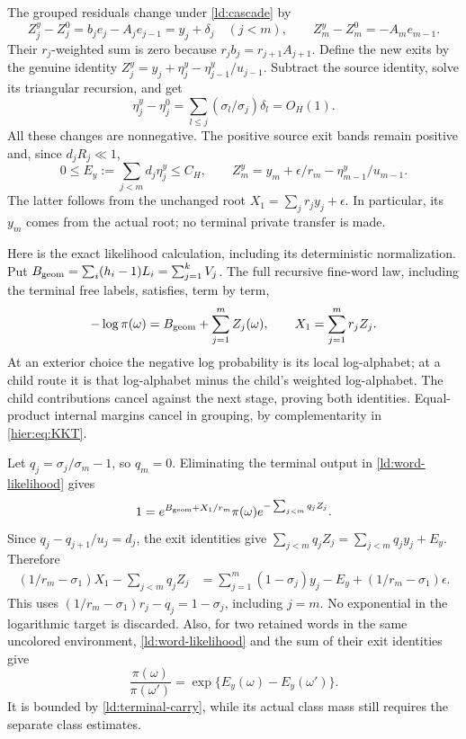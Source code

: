 The grouped residuals change under \eqref{ld:cascade} by
\begin{equation}
 Z_j^y-Z_j^0=b_je_j-A_je_{j-1}=y_j+\delta_j\quad(j<m),\qquad
 Z_m^y-Z_m^0=-A_me_{m-1}.
 \label{ld:output-changes}
\end{equation}
Their \(r_j\)-weighted sum is zero because
\(r_jb_j=r_{j+1}A_{j+1}\).  Define the new exits by the genuine
identity \(Z_j^y=y_j+\eta_j^y-\eta_{j-1}^y/u_{j-1}\).
Subtract the source identity, solve its triangular recursion, and get
\begin{equation}
 \eta_j^y-\eta_j^0=
       \sum_{l\le j}(\sigma_l/\sigma_j)\delta_l=O_H(1).
 \label{ld:exit-changes}
\end{equation}
All these changes are nonnegative.  The positive source exit bands
remain positive and, since \(d_jR_j\ll1\),
\begin{equation}
 0\le E_y:=\sum_{j<m}d_j\eta_j^y\le C_H,\qquad
 Z_m^y=y_m+\epsilon/r_m-\eta_{m-1}^y/u_{m-1}.
 \label{ld:terminal-carry}
\end{equation}
The latter follows from the unchanged root
\(X_1=\sum_jr_jy_j+\epsilon\).  In particular, its \(y_m\)
comes from the actual root; no terminal private transfer is made.

Here is the exact likelihood calculation, including its deterministic
normalization.  Put
\(B_{\rm geom}=\sum_i(h_i-1)L_i=\sum_{j=1}^kV_j\).
The full recursive fine-word law, including the terminal free labels,
satisfies, term by term,
\begin{equation}
 -\log\pi(\omega)=B_{\rm geom}+\sum_{j=1}^mZ_j(\omega),\qquad
 X_1=\sum_{j=1}^mr_jZ_j.
 \label{ld:word-likelihood}
\end{equation}
At an exterior choice the negative log probability is its local
log-alphabet; at a child route it is that log-alphabet minus the
child's weighted log-alphabet.  The child contributions cancel
against the next stage, proving both identities.  Equal-product
internal margins cancel in grouping, by complementarity in
\eqref{hier:eq:KKT}.

Let \(q_j=\sigma_j/\sigma_m-1\), so \(q_m=0\).  Eliminating the
terminal output in \eqref{ld:word-likelihood} gives
\[
 1=e^{B_{\rm geom}+X_1/r_m}\pi(\omega)
                  e^{-\sum_{j<m}q_jZ_j}.
\]
Since \(q_j-q_{j+1}/u_j=d_j\), the exit identities give
\(\sum_{j<m}q_jZ_j=\sum_{j<m}q_jy_j+E_y\).
Therefore
\begin{align}
 (1/r_m-\sigma_1)X_1-\sum_{j<m}q_jZ_j
   &=\sum_{j=1}^m(1-\sigma_j)y_j-E_y
                 +(1/r_m-\sigma_1)\epsilon.
 \label{ld:likelihood-cancellation}
\end{align}
This uses
\((1/r_m-\sigma_1)r_j-q_j=1-\sigma_j\), including \(j=m\).
No exponential in the logarithmic target is discarded.
Also, for two retained words in the same uncolored environment,
\eqref{ld:word-likelihood} and the sum of their exit identities give
\begin{equation}
 \frac{\pi(\omega)}{\pi(\omega')}
             =\exp\{E_y(\omega)-E_y(\omega')\}.
 \label{ld:relative-likelihood}
\end{equation}
It is bounded by \eqref{ld:terminal-carry}, while its actual class
mass still requires the separate class estimates.

